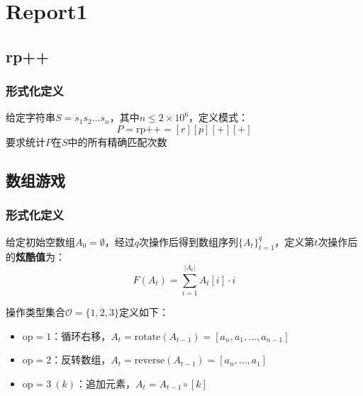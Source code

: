 \documentclass[../mainReport.tex]{subfiles} %
\begin{document}
\section{Report1}\label{sec: report1}
\subsection{rp++}\label{sec: rp++}
\subsubsection{形式化定义}\label{sec: rp++形式化定义}
给定字符串$S = s_1s_2...s_n$，其中$n \leq 2 \times 10^6$，定义模式：
$$
P = \text{rp++} = [r][p][+][+]
$$
要求统计$P$在$S$中的所有精确匹配次数





\subsection{数组游戏}
\subsubsection{形式化定义}
给定初始空数组$ A_0 = \emptyset $，经过$q$次操作后得到数组序列$\{A_t\}_{t=1}^q$，定义第$t$次操作后的\textbf{炫酷值}为：
$$
F(A_t) = \sum_{i=1}^{|A_t|} A_t[i] \cdot i
$$

操作类型集合$\mathcal{O} = \{1,2,3\}$定义如下：
\begin{itemize}
\item $\text{op}=1$：循环右移，$A_t = \text{rotate}(A_{t-1}) = [a_n,a_1,...,a_{n-1}]$
\item $\text{op}=2$：反转数组，$A_t = \text{reverse}(A_{t-1}) = [a_n,...,a_1]$
\item $\text{op}=3\ (k)$：追加元素，$A_t = A_{t-1} \circ [k]$
\end{itemize}
\end{document}
